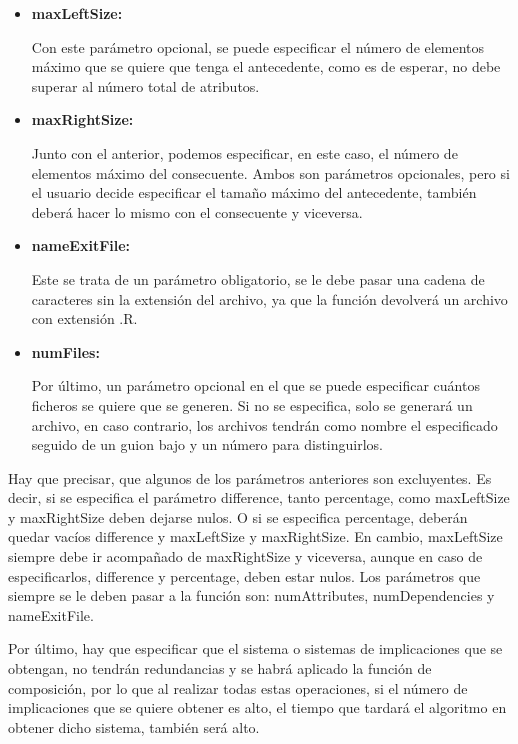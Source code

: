 \begin{itemize}
        \item \textbf{maxLeftSize:}

        Con este par\'ametro opcional, se puede especificar el n\'umero de elementos m\'aximo que se quiere que tenga el antecedente, como 
        es de esperar, no debe superar al n\'umero total de atributos.


        \item \textbf{maxRightSize:}

        Junto con el anterior, podemos especificar, en este caso, el n\'umero de elementos m\'aximo del consecuente. Ambos son par\'ametros 
        opcionales, pero si el usuario decide especificar el tama\~no m\'aximo del antecedente, tambi\'en deber\'a hacer lo mismo con el 
        consecuente y viceversa.


        \item \textbf{nameExitFile:}

        Este se trata de un par\'ametro obligatorio, se le debe pasar una cadena de caracteres sin la extensi\'on del archivo, ya que 
        la funci\'on devolver\'a un archivo con extensi\'on .R.


        \item \textbf{numFiles:}

        Por \'ultimo, un par\'ametro opcional en el que se puede especificar cu\'antos ficheros se quiere que se generen. Si no se especifica, 
        solo se generar\'a un archivo, en caso contrario, los archivos tendr\'an como nombre el especificado seguido de un guion bajo y un n\'umero 
        para distinguirlos.

    \end{itemize}

    Hay que precisar, que algunos de los par\'ametros anteriores son excluyentes. Es decir, si se especifica el par\'ametro difference, tanto 
    percentage, como maxLeftSize y maxRightSize deben dejarse nulos. O si se especifica percentage, deber\'an quedar vac\'ios difference y 
    maxLeftSize y maxRightSize. 
    En cambio, maxLeftSize siempre debe ir acompa\~nado de maxRightSize y viceversa, aunque en caso de especificarlos, difference y percentage, 
    deben estar nulos.
    Los par\'ametros que siempre se le deben pasar a la funci\'on son: numAttributes, numDependencies y nameExitFile.

    Por \'ultimo, hay que especificar que el sistema o sistemas de implicaciones que se obtengan, no tendr\'an redundancias y se habr\'a aplicado 
    la funci\'on de composici\'on, por lo que al realizar todas estas operaciones, si el n\'umero de implicaciones que se quiere obtener es 
    alto, el tiempo que tardar\'a el algoritmo en obtener dicho sistema, tambi\'en ser\'a alto.
    \\

